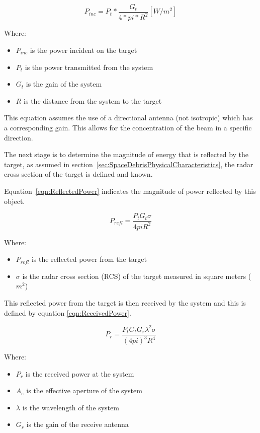 \documentclass[11pt]{witseiepaper}
\begin{document}
\begin{equation} \label{eqn:IncidentPower}
P_{inc} = P_t * \frac{G_{t}}{4 * pi * R^2} [W/m^2]
\end{equation}

Where:
\begin{itemize}
    \item $P_{inc}$ is the power incident on the target
    \item $P_t$ is the power transmitted from the system
    \item $G_t$ is the gain of the system
    \item $R$ is the distance from the system to the target
\end{itemize}

This equation assumes the use of a directional antenna (not isotropic) which has a corresponding gain. This allows for the concentration of the beam in a specific direction.

The next stage is to determine the magnitude of energy that is reflected by the target, as assumed in section~\ref{sec:SpaceDebrisPhysicalCharacteristics}, the radar cross section of the target is defined and known. 

Equation~\ref{eqn:ReflectedPower} indicates the magnitude of power reflected by this object.

\begin{equation} \label{eqn:ReflectedPower}
P_{refl} = \frac{P_{t} G_{t} \sigma}{4 pi R^2}
\end{equation}

Where:
\begin{itemize}
    \item $P_{refl}$ is the reflected power from the target
    \item $\sigma$ is the radar cross section (RCS) of the target measured in square meters ($m^2$)
\end{itemize}

This reflected power from the target is then received by the system and this is defined by equation \ref{eqn:ReceivedPower}.

\begin{equation} \label{eqn:ReceivedPower}
P_{r} = \frac{P_{t} G_{t} G_{r} \lambda^2 \sigma}{(4 pi )^3 R^4}
\end{equation}

Where:
\begin{itemize}
    \item $P_{r}$ is the received power at the system
    \item $A_{e}$ is the effective aperture of the system
    \item $\lambda$ is the wavelength of the system
    \item $G_{r}$ is the gain of the receive antenna
\end{itemize}
\end{document}
